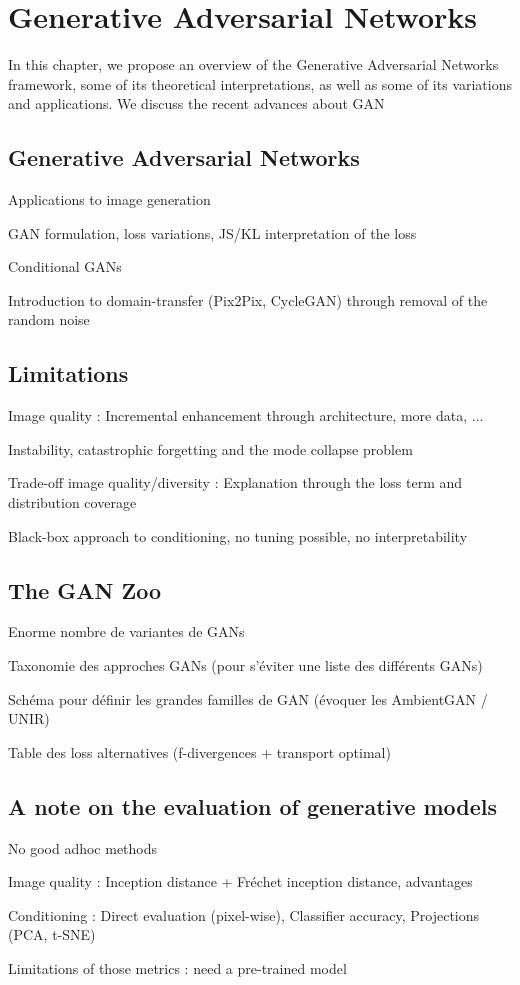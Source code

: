 \chapter{Generative Adversarial Networks}
\label{chap:chapter1}

\begin{chapterabstract}
	In this chapter, we propose an overview	 of the Generative Adversarial Networks \cite{Goodfellow2014} framework, some of its theoretical interpretations, as well as some of its variations and applications. We discuss the recent advances about \ac{GAN}
\end{chapterabstract}

\section{Generative Adversarial Networks}
Applications to image generation

GAN formulation, loss variations, JS/KL interpretation of the loss

Conditional GANs

Introduction to domain-transfer (Pix2Pix, CycleGAN) through removal of the random noise

\section{Limitations}
Image quality : Incremental enhancement through architecture, more data, ... 

Instability, catastrophic forgetting and the mode collapse problem

Trade-off image quality/diversity : Explanation through the loss term and distribution coverage

Black-box approach to conditioning, no tuning possible, no interpretability

\section{The GAN Zoo}

Enorme nombre de variantes de GANs

Taxonomie des approches GANs (pour s'éviter une liste des différents GANs)

Schéma pour définir les grandes familles de GAN (évoquer les AmbientGAN / UNIR)

Table des loss alternatives (f-divergences + transport optimal)


\section{A note on the  evaluation of generative models}

No good adhoc methods

Image quality : Inception distance + Fréchet inception distance, advantages

Conditioning : Direct evaluation (pixel-wise), Classifier accuracy, Projections (PCA, t-SNE)

Limitations of those metrics : need a pre-trained model


